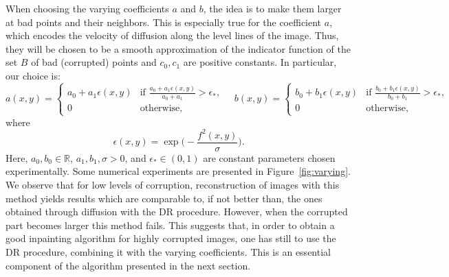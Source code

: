 \documentclass[proc]{edpsmath}
\begin{document}
When choosing the varying coefficients $a$ and $b$, the idea is to make them larger at bad points and their neighbors. This is especially  true for the coefficient $a$, which encodes the velocity of diffusion along the level lines of the image. Thus,  they will be chosen to be a smooth approximation of the indicator function of the set $B$ of bad (corrupted) points  and $c_0, c_1$ are positive constants. In particular, our choice is:
\begin{equation*}
  a(x,y) = \begin{cases}
    a_0 + a_1 \epsilon(x,y) & \text{if } \frac{a_0+a_1\epsilon(x,y)}{a_0+a_1}>\epsilon_*,\\
    0& \text{otherwise,}
  \end{cases}\quad
  b(x,y) = \begin{cases}
    b_0 + b_1 \epsilon(x,y) &  \text{if } \frac{b_0+b_1\epsilon(x,y)}{b_0+b_1}>\epsilon_*,\\
    0& \text{otherwise,}
  \end{cases}
\end{equation*}
where
\begin{equation*}
  \epsilon(x,y) = \exp \biggl(-\frac{f^2(x,y)}{\sigma}\biggr).
\end{equation*}
Here, $a_0, b_0\in\mathbb R$, $a_1,b_1,\sigma>0$, and $\epsilon_*\in(0,1)$ are constant parameters chosen experimentally.
Some numerical experiments are presented in Figure~\ref{fig:varying}.
We observe that for low levels of corruption, reconstruction of images with this method yields results which are comparable to, if not better than, the ones obtained through diffusion with the DR procedure.
However, when the corrupted part becomes larger this method fails.
This suggests that, in order to obtain a good inpainting algorithm for highly corrupted images, one has still to use the DR procedure, combining it with the varying coefficients.
This is an essential component of the algorithm presented in the next section.
\end{document}
